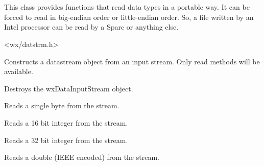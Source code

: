 \section{}\label{wxdatainputstream}

This class provides functions that read data types in a
portable way. It can be forced to read in big-endian order or 
little-endian order. So, a file written by an Intel processor can be read by a
Sparc or anything else.


<wx/datstrm.h>


\label{wxdatainputstreamconstr}


Constructs a datastream object from an input stream. Only read methods will
be available.





Destroys the wxDataInputStream object.



Reads a single byte from the stream.



Reads a 16 bit integer from the stream.



Reads a 32 bit integer from the stream.



Reads a double (IEEE encoded) from the stream.

